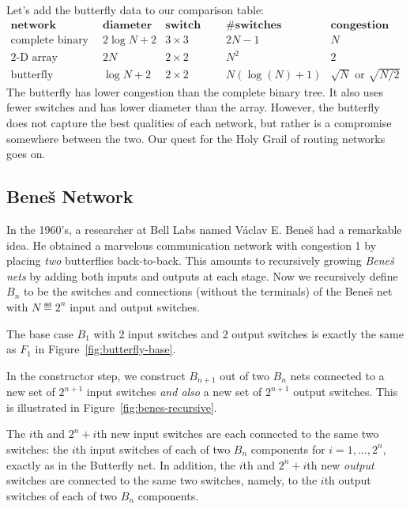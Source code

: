 Let's add the butterfly data to our comparison table:
%
\[
\begin{array}{r|c|c|c|c}
\textbf{network} &
\textbf{diameter} &
\textbf{switch size} &
\textbf{\# switches} &
\textbf{congestion} \\ \hline
\text{complete binary tree} & 2 \log N + 2 & 3 \times 3 & 2N - 1 & N \\
\text{2-D array} & 2 N & 2 \times 2 & N^2 & 2 \\
\text{butterfly} & \log N + 2 & 2 \times 2 & N (\log(N) + 1) & \sqrt{N} \text{ or } \sqrt{N/2}
\end{array}
\]
% 
The butterfly has lower congestion than the complete binary tree.
It also uses fewer switches and has lower diameter than the array.
However, the butterfly does not capture the best qualities of each
network, but rather is a compromise somewhere between the two.  Our
quest for the Holy Grail of routing networks goes on.

\subsection{Bene\v{s} Network}

In the 1960's, a researcher at Bell Labs named V\'{a}clav E. Bene\v{s}%
 had a
remarkable idea.  He obtained a marvelous communication network with
congestion 1 by placing \textit{two} butterflies back-to-back.  This
amounts to recursively growing \emph{Bene\v{s} nets}%
by adding both inputs and outputs at each stage.  Now we 
recursively define $B_n$ to be the
switches and connections (without the terminals) of the Bene\v{s} net
with $N \eqdef 2^n$ input and output switches.

The base case $B_1$ with 2 input switches and 2 output switches is
exactly the same as $F_1$ in Figure~\ref{fig:butterfly-base}.

In the constructor step, we construct $B_{n+1}$ out of two $B_n$ nets
connected to a new set of $2^{n+1}$ input switches \emph{and also} a
new set of $2^{n+1}$ output switches.  This is illustrated in
Figure~\ref{fig:benes-recursive}.

The $i$th and $2^n+i$th new input switches are each connected to
the same two switches: the $i$th input switches of each of two
$B_n$ components for $i=1,\dots,2^n$, exactly as in the Butterfly net.  In
addition, the $i$th and $2^n+i$th new \emph{output} switches are connected
to the same two switches, namely, to the $i$th output switches of each of
two $B_n$ components.

